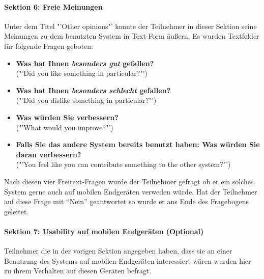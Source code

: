 \documentclass[11pt,a4paper,twoside,ngerman]{article}
\begin{document}
\paragraph{Sektion 6: Freie Meinungen}
Unter dem Titel "'Other opinions"' konnte der Teilnehmer in dieser Sektion seine Meinungen zu dem benutzten System in Text-Form äußern. Es wurden Textfelder für folgende Fragen geboten:

\begin{itemize}
    \item \textbf{Was hat Ihnen \emph{besonders gut} gefallen?} \\ ("'Did you like something in particular?"')
    \item \textbf{Was hat Ihnen \emph{besonders schlecht} gefallen?} \\ ("'Did you dislike something in particular?"')
    \item \textbf{Was würden Sie verbessern?} \\ ("'What would you improve?"')
    \item \textbf{Falls Sie das andere System bereits benutzt haben: Was würden Sie daran verbessern?} \\ ("'You feel like you can contribute something to the other system?"')
\end{itemize}

\noindent
Nach diesen vier Freitext-Fragen wurde der Teilnehmer gefragt ob er ein solches System gerne auch auf mobilen Endgeräten verweden würde. Hat der Teilnehmer auf diese Frage mit "`Nein"' geantwortet so wurde er ans Ende des Fragebogens geleitet.

\paragraph{Sektion 7: Usability auf mobilen Endgeräten (Optional)}
Teilnehmer die in der vorigen Sektion angegeben haben, dass sie an einer Benutzung des Systems auf mobilen Endgeräten interessiert wären wurden hier zu ihrem Verhalten auf diesen Geräten befragt.
\end{document}
